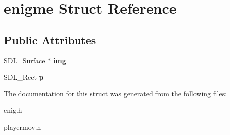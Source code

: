 \hypertarget{structenigme}{}\section{enigme Struct Reference}
\label{structenigme}
\subsection*{Public Attributes}
\begin{DoxyCompactItemize}
\item 
\mbox{\label{structenigme_aed2865ec5864f0d48865e23210a615e5}} 
S\+D\+L\+\_\+\+Surface $\ast$ {\bfseries img}
\item 
\mbox{\label{structenigme_a1ecc3fa572d2c308e1aecacf74fd1ec0}} 
S\+D\+L\+\_\+\+Rect {\bfseries p}
\end{DoxyCompactItemize}


The documentation for this struct was generated from the following files\+:\begin{DoxyCompactItemize}
\item 
enig.\+h\item 
playermov.\+h\end{DoxyCompactItemize}

